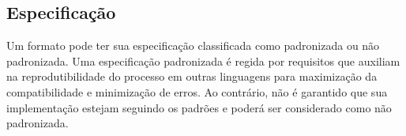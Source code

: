 \subsection[Especificação]{Especificação}

Um formato pode ter sua especificação classificada como padronizada ou não padronizada. Uma especificação padronizada é regida por requisitos que auxiliam na reprodutibilidade do processo em outras linguagens para maximização da compatibilidade e minimização de erros. Ao contrário, não é garantido que sua implementação estejam seguindo os padrões e poderá ser considerado como não padronizada. \cite{McDermid1991}
